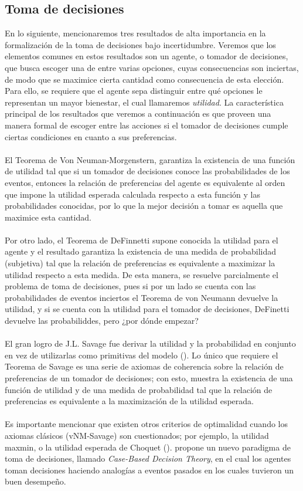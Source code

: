 \documentclass[11pt]{article}
\theoremstyle{plain}
\begin{document}
\subsection{Toma de decisiones}
En lo siguiente, mencionaremos tres resultados de alta importancia en la formalización de la toma de decisiones bajo incertidumbre. Veremos que los elementos comunes en estos resultados son un agente, o tomador de decisiones, que busca escoger una de entre varias opciones, cuyas consecuencias son inciertas, de modo que se maximice cierta cantidad como consecuencia de esta elección. Para ello, se requiere que el agente sepa distinguir entre qué opciones le representan un mayor bienestar, el cual llamaremos \textit{utilidad}. La característica principal de los resultados que veremos a continuación es que proveen una manera formal de escoger entre las acciones si el tomador de decisiones cumple ciertas condiciones en cuanto a sus preferencias.\\
\\
\indent El Teorema de Von Neuman-Morgenstern, garantiza la existencia de una función de utilidad tal que si un tomador de decisiones conoce las probabilidades de los eventos, entonces la relación de preferencias del agente es equivalente al orden que impone la utilidad esperada calculada respecto a esta función y las probabilidades conocidas, por lo que la mejor decisión a tomar es aquella que maximice esta cantidad.\\
\\
\indent Por otro lado, el Teorema de DeFinnetti supone conocida la utilidad para el agente y el resultado garantiza la existencia de una medida de probabilidad (subjetiva) tal que la relación de preferencias es equivalente a maximizar la utilidad respecto a esta medida. De esta manera, se resuelve parcialmente el problema de toma de decisiones, pues si por un lado se cuenta con las probabilidades de eventos inciertos el Teorema de von Neumann devuelve la utilidad, y si se cuenta con la utilidad para el tomador de decisiones, DeFinetti devuelve las probabiliddes, pero ¿por dónde empezar? \\
\\
\indent El gran logro de J.L. Savage fue derivar  la utilidad y la probabilidad en conjunto en vez de utilizarlas como primitivas del modelo (\cite{gilboa2009decision}). Lo único que requiere el Teorema de Savage es una serie de axiomas de coherencia sobre la relación de preferencias de un tomador de decisiones; con esto, muestra la existencia de una función de utilidad y de una medida de probabilidad tal que la relación de preferencias es equivalente a la maximización de la utilidad esperada.\\
\\
 \indent Es importante mencionar que existen otros criterios de optimalidad cuando los axiomas clásicos (vNM-Savage) son cuestionados; por ejemplo, la utilidad maxmin, o la utilidad esperada de Choquet (\cite{gilboa2009decision}). \cite{gilboa2001theory} propone un nuevo paradigma de toma de decisiones, llamado \textit{Case-Based Decision Theory}, en el cual los agentes toman decisiones haciendo analogías a eventos pasados en los cuales tuvieron un buen desempeño.
\end{document}
